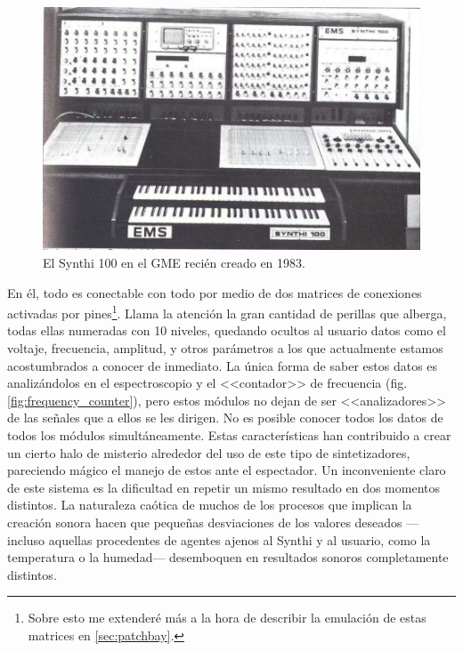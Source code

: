 \begin{figure}
	\centering
	\includegraphics[width=1\textwidth]{synthi_1984}
	\caption[El Synthi 100 en el GME recién creado en 1983.]{El Synthi 100 en el GME recién creado en 1983.}
	\label{fig:synthi_1984}
\end{figure}

En él, todo es conectable con todo por medio de dos matrices de conexiones activadas por pines\footnote{Sobre esto me extenderé más a la hora de describir la emulación de estas matrices en \ref{sec:patchbay}.}. Llama la atención la gran cantidad de perillas que alberga, todas ellas numeradas con 10 niveles, quedando ocultos al usuario datos como el voltaje, frecuencia, amplitud, y otros parámetros a los que actualmente estamos acostumbrados a conocer de inmediato. La única forma de saber estos datos es analizándolos en el espectroscopio y el <<contador>> de frecuencia (fig. \ref{fig:frequency_counter}), pero estos módulos no dejan de ser <<analizadores>> de las señales que a ellos se les dirigen. No es posible conocer todos los datos de todos los módulos simultáneamente. Estas características han contribuido a crear un cierto halo de misterio alrededor del uso de este tipo de sintetizadores, pareciendo mágico el manejo de estos ante el espectador. Un inconveniente claro de este sistema es la dificultad en repetir un mismo resultado en dos momentos distintos. La naturaleza caótica de muchos de los procesos que implican la creación sonora hacen que pequeñas desviaciones de los valores deseados ---incluso aquellas procedentes de agentes ajenos al Synthi y al usuario, como la temperatura o la humedad--- desemboquen en resultados sonoros completamente distintos.

